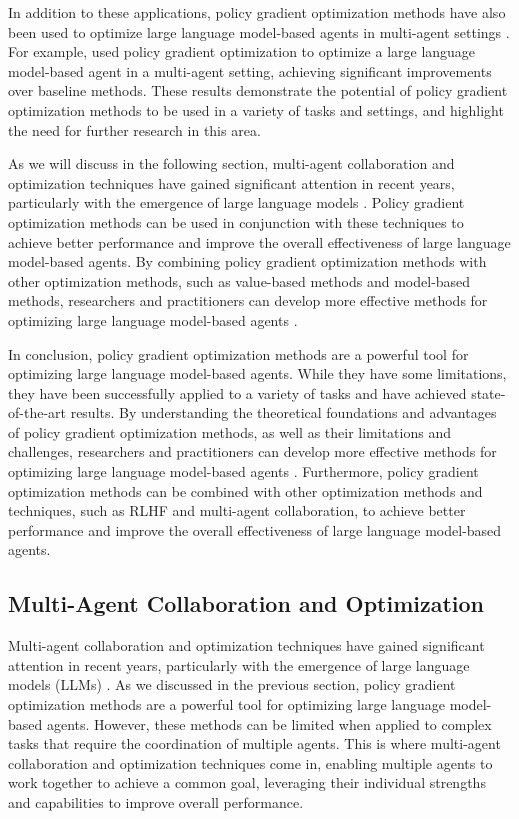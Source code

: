 \documentclass[11pt]{article}
\begin{document}
In addition to these applications, policy gradient optimization methods have also been used to optimize large language model-based agents in multi-agent settings \cite{ref172}. For example, \cite{ref172} used policy gradient optimization to optimize a large language model-based agent in a multi-agent setting, achieving significant improvements over baseline methods. These results demonstrate the potential of policy gradient optimization methods to be used in a variety of tasks and settings, and highlight the need for further research in this area.

As we will discuss in the following section, multi-agent collaboration and optimization techniques have gained significant attention in recent years, particularly with the emergence of large language models \cite{ref173}. Policy gradient optimization methods can be used in conjunction with these techniques to achieve better performance and improve the overall effectiveness of large language model-based agents. By combining policy gradient optimization methods with other optimization methods, such as value-based methods and model-based methods, researchers and practitioners can develop more effective methods for optimizing large language model-based agents \cite{ref168}.

In conclusion, policy gradient optimization methods are a powerful tool for optimizing large language model-based agents. While they have some limitations, they have been successfully applied to a variety of tasks and have achieved state-of-the-art results. By understanding the theoretical foundations and advantages of policy gradient optimization methods, as well as their limitations and challenges, researchers and practitioners can develop more effective methods for optimizing large language model-based agents \cite{ref166}. Furthermore, policy gradient optimization methods can be combined with other optimization methods and techniques, such as RLHF and multi-agent collaboration, to achieve better performance and improve the overall effectiveness of large language model-based agents.

\subsection{Multi-Agent Collaboration and Optimization}

Multi-agent collaboration and optimization techniques have gained significant attention in recent years, particularly with the emergence of large language models (LLMs) \cite{ref173}. As we discussed in the previous section, policy gradient optimization methods are a powerful tool for optimizing large language model-based agents. However, these methods can be limited when applied to complex tasks that require the coordination of multiple agents. This is where multi-agent collaboration and optimization techniques come in, enabling multiple agents to work together to achieve a common goal, leveraging their individual strengths and capabilities to improve overall performance.
\end{document}
